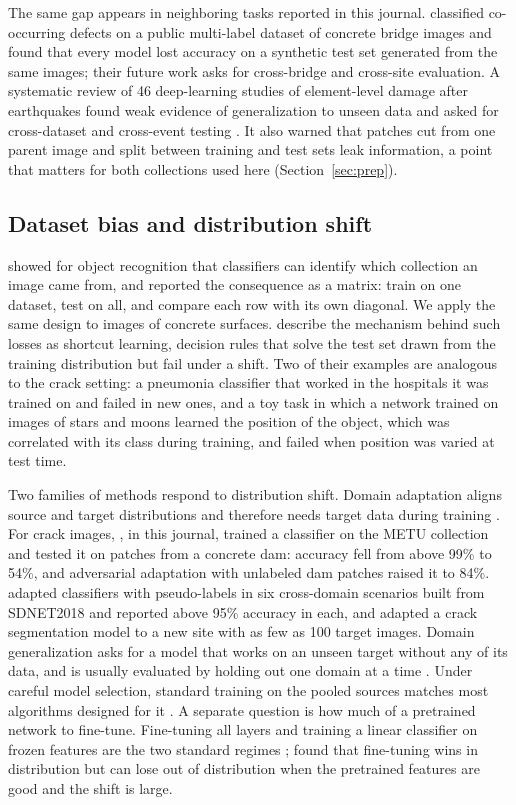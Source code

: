\documentclass[pdflatex,sn-apa]{sn-jnl}
\begin{document}
The same gap appears in neighboring tasks reported in this journal. \citet{lateef2026} classified co-occurring defects on a public multi-label dataset of concrete bridge images and found that every model lost accuracy on a synthetic test set generated from the same images; their future work asks for cross-bridge and cross-site evaluation. A systematic review of 46 deep-learning studies of element-level damage after earthquakes found weak evidence of generalization to unseen data and asked for cross-dataset and cross-event testing \citep{abeysuriya2026}. It also warned that patches cut from one parent image and split between training and test sets leak information, a point that matters for both collections used here (Section~\ref{sec:prep}).

\subsection{Dataset bias and distribution shift}\label{sec:related-shift}

\citet{torralba2011} showed for object recognition that classifiers can identify which collection an image came from, and reported the consequence as a matrix: train on one dataset, test on all, and compare each row with its own diagonal. We apply the same design to images of concrete surfaces. \citet{geirhos2020} describe the mechanism behind such losses as shortcut learning, decision rules that solve the test set drawn from the training distribution but fail under a shift. Two of their examples are analogous to the crack setting: a pneumonia classifier that worked in the hospitals it was trained on and failed in new ones, and a toy task in which a network trained on images of stars and moons learned the position of the object, which was correlated with its class during training, and failed when position was varied at test time.

Two families of methods respond to distribution shift. Domain adaptation aligns source and target distributions and therefore needs target data during training \citep{wang2018}. For crack images, \citet{santos2022}, in this journal, trained a classifier on the METU collection and tested it on patches from a concrete dam: accuracy fell from above 99\% to 54\%, and adversarial adaptation with unlabeled dam patches raised it to 84\%. \citet{zhu2026concracknet} adapted classifiers with pseudo-labels in six cross-domain scenarios built from SDNET2018 and reported above 95\% accuracy in each, and \citet{chun2024} adapted a crack segmentation model to a new site with as few as 100 target images. Domain generalization asks for a model that works on an unseen target without any of its data, and is usually evaluated by holding out one domain at a time \citep{zhou2023dg}. Under careful model selection, standard training on the pooled sources matches most algorithms designed for it \citep{gulrajani2021}. A separate question is how much of a pretrained network to fine-tune. Fine-tuning all layers and training a linear classifier on frozen features are the two standard regimes \citep{kornblith2019}; \citet{kumar2022} found that fine-tuning wins in distribution but can lose out of distribution when the pretrained features are good and the shift is large.
\end{document}
